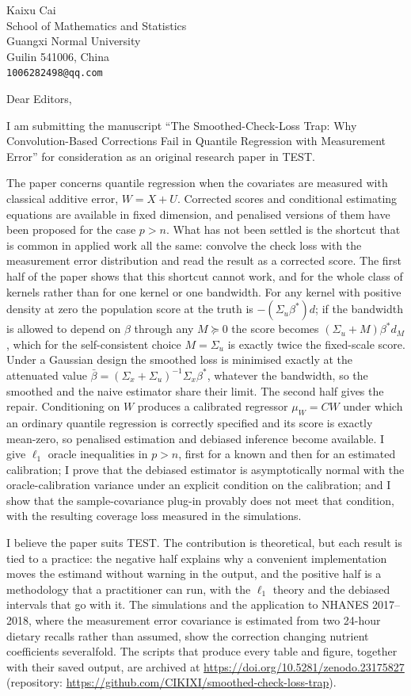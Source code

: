 \documentclass[11pt]{article}
\begin{document}
Kaixu Cai\\
School of Mathematics and Statistics\\
Guangxi Normal University\\
Guilin 541006, China\\
\texttt{1006282498@qq.com}

\bigskip
Dear Editors,

I am submitting the manuscript ``The Smoothed-Check-Loss Trap: Why Convolution-Based
Corrections Fail in Quantile Regression with Measurement Error'' for consideration as an
original research paper in TEST.

The paper concerns quantile regression when the covariates are measured with classical
additive error, $W=X+U$. Corrected scores and conditional estimating equations are available
in fixed dimension, and penalised versions of them have been proposed for the case $p>n$. What
has not been settled is the shortcut that is common in applied work all the same: convolve the
check loss with the measurement error distribution and read the result as a corrected score.
The first half of the paper shows that this shortcut cannot work, and for the whole class of
kernels rather than for one kernel or one bandwidth. For any kernel with positive density at
zero the population score at the truth is $-(\Sigma_u\beta^*)d$; if the bandwidth is allowed to
depend on $\beta$ through any $M\succeq0$ the score becomes $(\Sigma_u+M)\beta^*d_M$, which for
the self-consistent choice $M=\Sigma_u$ is exactly twice the fixed-scale score. Under a
Gaussian design the smoothed loss is minimised exactly at the attenuated value
$\bar\beta=(\Sigma_x+\Sigma_u)^{-1}\Sigma_x\beta^*$, whatever the bandwidth, so the smoothed and
the naive estimator share their limit. The second half gives the repair. Conditioning on $W$
produces a calibrated regressor $\mu_W=CW$ under which an ordinary quantile regression is
correctly specified and its score is exactly mean-zero, so penalised estimation and debiased
inference become available. I give $\ell_1$ oracle inequalities in $p>n$, first for a known and
then for an estimated calibration; I prove that the debiased estimator is asymptotically normal
with the oracle-calibration variance under an explicit condition on the calibration; and I show
that the sample-covariance plug-in provably does not meet that condition, with the resulting
coverage loss measured in the simulations.

I believe the paper suits TEST. The contribution is theoretical, but each result is tied to a
practice: the negative half explains why a convenient implementation moves the estimand without
warning in the output, and the positive half is a methodology that a practitioner can run, with
the $\ell_1$ theory and the debiased intervals that go with it. The simulations and the
application to NHANES 2017--2018, where the measurement error covariance is estimated from two
24-hour dietary recalls rather than assumed, show the correction changing nutrient
coefficients severalfold. The scripts that produce every table and figure, together with their
saved output, are archived at \url{https://doi.org/10.5281/zenodo.23175827} (repository:
\url{https://github.com/CIKIXI/smoothed-check-loss-trap}).
\end{document}
